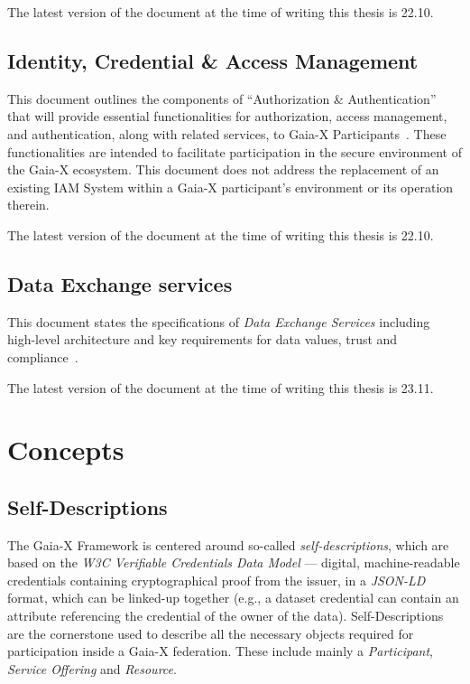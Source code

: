 The latest version of the document at the time of writing this thesis is 22.10.

\subsection{Identity, Credential \& Access Management}\label{subsec:identity-credential-&-access-management}

This document outlines the components of ``Authorization \& Authentication'' that will provide essential functionalities for authorization, access management, and authentication, along with related services, to Gaia-X Participants~\cite{gaiax_identity_and_access_management}.
These functionalities are intended to facilitate participation in the secure environment of the Gaia-X ecosystem.
This document does not address the replacement of an existing IAM System within a Gaia-X participant's environment or its operation therein.

The latest version of the document at the time of writing this thesis is 22.10.

\subsection{Data Exchange services}\label{subsec:data-exchange-services}

This document states the specifications of \textit{Data Exchange Services} including high-level architecture and key requirements for data values, trust and compliance~\cite{gaiax_data_exchange_document}.

The latest version of the document at the time of writing this thesis is 23.11.

\section{Concepts}\label{sec:concepts}

\subsection{Self-Descriptions}\label{subsec:self-descriptions}
The Gaia-X Framework is centered around so-called \textit{self-descriptions}, which are based on the \textit{W3C Verifiable Credentials Data Model} --- digital, machine-readable credentials containing cryptographical proof from the issuer, in a \textit{JSON-LD} format, which can be linked-up together (e.g., a dataset credential can contain an attribute referencing the credential of the owner of the data).
Self-Descriptions are the cornerstone used to describe all the necessary objects required for participation inside a Gaia-X federation.
These include mainly a \textit{Participant}, \textit{Service Offering} and \textit{Resource}.

